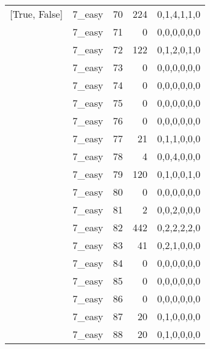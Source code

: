 \begin{tabular}{llrrl}
 [True, False]   & 7\_easy              &            70 &                   224 & 0,1,4,1,1,0   \\
 [True, False]   & 7\_easy              &            71 &                     0 & 0,0,0,0,0,0   \\
 [True, False]   & 7\_easy              &            72 &                   122 & 0,1,2,0,1,0   \\
 [True, False]   & 7\_easy              &            73 &                     0 & 0,0,0,0,0,0   \\
 [True, False]   & 7\_easy              &            74 &                     0 & 0,0,0,0,0,0   \\
 [True, False]   & 7\_easy              &            75 &                     0 & 0,0,0,0,0,0   \\
 [True, False]   & 7\_easy              &            76 &                     0 & 0,0,0,0,0,0   \\
 [True, False]   & 7\_easy              &            77 &                    21 & 0,1,1,0,0,0   \\
 [True, False]   & 7\_easy              &            78 &                     4 & 0,0,4,0,0,0   \\
 [True, False]   & 7\_easy              &            79 &                   120 & 0,1,0,0,1,0   \\
 [True, False]   & 7\_easy              &            80 &                     0 & 0,0,0,0,0,0   \\
 [True, False]   & 7\_easy              &            81 &                     2 & 0,0,2,0,0,0   \\
 [True, False]   & 7\_easy              &            82 &                   442 & 0,2,2,2,2,0   \\
 [True, False]   & 7\_easy              &            83 &                    41 & 0,2,1,0,0,0   \\
 [True, False]   & 7\_easy              &            84 &                     0 & 0,0,0,0,0,0   \\
 [True, False]   & 7\_easy              &            85 &                     0 & 0,0,0,0,0,0   \\
 [True, False]   & 7\_easy              &            86 &                     0 & 0,0,0,0,0,0   \\
 [True, False]   & 7\_easy              &            87 &                    20 & 0,1,0,0,0,0   \\
 [True, False]   & 7\_easy              &            88 &                    20 & 0,1,0,0,0,0   \\

\end{tabular}
